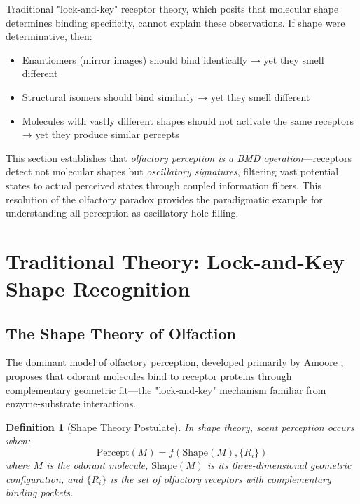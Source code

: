 \documentclass[12pt,a4paper]{article}
\newtheorem{definition}{Definition}
\begin{document}
Traditional "lock-and-key" receptor theory, which posits that molecular shape determines binding specificity, cannot explain these observations. If shape were determinative, then:
\begin{itemize}
\item Enantiomers (mirror images) should bind identically → yet they smell different
\item Structural isomers should bind similarly → yet they smell different
\item Molecules with vastly different shapes should not activate the same receptors → yet they produce similar percepts
\end{itemize}

This section establishes that \textit{olfactory perception is a BMD operation}—receptors detect not molecular shapes but \textit{oscillatory signatures}, filtering vast potential states to actual perceived states through coupled information filters. This resolution of the olfactory paradox provides the paradigmatic example for understanding all perception as oscillatory hole-filling.

\section{Traditional Theory: Lock-and-Key Shape Recognition}

\subsection{The Shape Theory of Olfaction}

The dominant model of olfactory perception, developed primarily by Amoore \cite{amoore1964stereochemical}, proposes that odorant molecules bind to receptor proteins through complementary geometric fit—the "lock-and-key" mechanism familiar from enzyme-substrate interactions.

\begin{definition}[Shape Theory Postulate]
\label{def:shape_theory}
In shape theory, scent perception occurs when:
\begin{equation}
\text{Percept}(M) = f(\text{Shape}(M), \{R_i\})
\end{equation}
where $M$ is the odorant molecule, $\text{Shape}(M)$ is its three-dimensional geometric configuration, and $\{R_i\}$ is the set of olfactory receptors with complementary binding pockets.
\end{definition}
\end{document}

